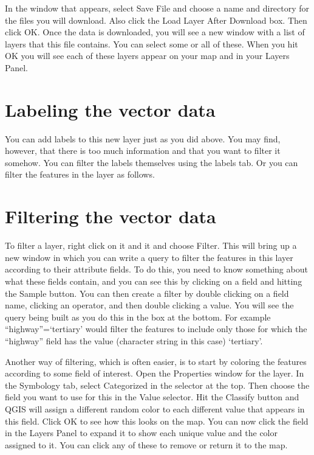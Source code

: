 \documentclass[]{book}
\begin{document}
In the window that appears, select Save File and choose a name and directory for the files you will download. Also click the Load Layer After Download box. Then click OK. Once the data is downloaded, you will see a new window with a list of layers that this file contains. You can select some or all of these. When you hit OK you will see each of these layers appear on your map and in your Layers Panel.

\hypertarget{labeling-the-vector-data}{%
\section{Labeling the vector data}\label{labeling-the-vector-data}}

You can add labels to this new layer just as you did above. You may find, however, that there is too much information and that you want to filter it somehow. You can filter the labels themselves using the labels tab. Or you can filter the features in the layer as follows.

\hypertarget{filtering-the-vector-data}{%
\section{Filtering the vector data}\label{filtering-the-vector-data}}

To filter a layer, right click on it and it and choose Filter. This will bring up a new window in which you can write a query to filter the features in this layer according to their attribute fields. To do this, you need to know something about what these fields contain, and you can see this by clicking on a field and hitting the Sample button. You can then create a filter by double clicking on a field name, clicking an operator, and then double clicking a value. You will see the query being built as you do this in the box at the bottom. For example ``highway''=`tertiary' would filter the features to include only those for which the ``highway'' field has the value (character string in this case) `tertiary'.

Another way of filtering, which is often easier, is to start by coloring the features according to some field of interest. Open the Properties window for the layer. In the Symbology tab, select Categorized in the selector at the top. Then choose the field you want to use for this in the Value selector. Hit the Classify button and QGIS will assign a different random color to each different value that appears in this field. Click OK to see how this looks on the map. You can now click the field in the Layers Panel to expand it to show each unique value and the color assigned to it. You can click any of these to remove or return it to the map.
\end{document}
